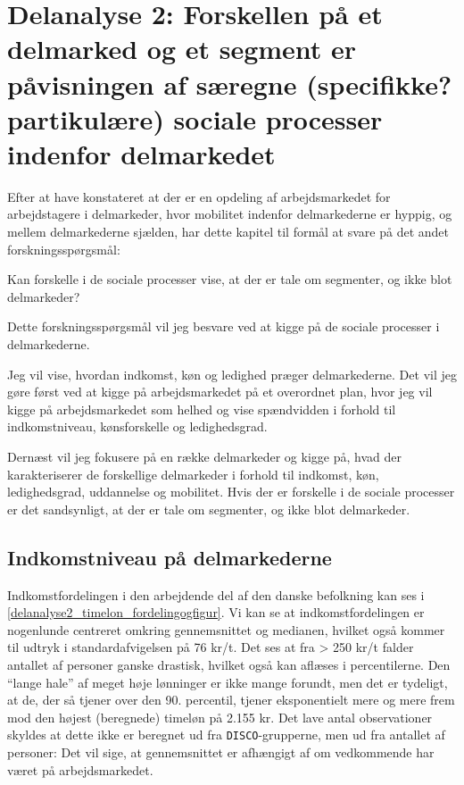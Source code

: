 

\chapter{Delanalyse 2: Forskellen på et delmarked og et segment er påvisningen af særegne (specifikke? partikulære) sociale processer indenfor delmarkedet \label{kapitel_delanalyse2_socialeprocesser}}

Efter at have konstateret at der er en opdeling af arbejdsmarkedet for arbejdstagere i delmarkeder, hvor mobilitet indenfor delmarkederne er hyppig, og mellem delmarkederne sjælden, har dette kapitel til formål at svare på det andet forskningsspørgsmål:

\begin{tcolorbox}[title=Forskningspørgsmål,
subtitle style={boxrule=0.4pt} ]
   Kan forskelle i de sociale processer vise, at der er tale om segmenter, og ikke blot delmarkeder?
\end{tcolorbox}

Dette forskningsspørgsmål vil jeg besvare ved at kigge på de sociale processer i delmarkederne.

Jeg vil vise, hvordan indkomst, køn og ledighed præger delmarkederne. Det vil jeg gøre først ved at kigge på arbejdsmarkedet på et overordnet plan, hvor jeg vil kigge på arbejdsmarkedet som helhed og vise spændvidden i forhold til indkomstniveau, kønsforskelle og ledighedsgrad.

Dernæst vil jeg fokusere på en række delmarkeder og kigge på, hvad der karakteriserer de forskellige delmarkeder i forhold til indkomst, køn, ledighedsgrad, uddannelse og mobilitet. Hvis der er forskelle i de sociale processer er det sandsynligt, at der er tale om segmenter, og ikke blot delmarkeder.


\section{Indkomstniveau på delmarkederne \label{sec_delanalyse2_loen}}

Indkomstfordelingen i den arbejdende del af den danske befolkning kan ses i \ref{delanalyse2_timelon_fordelingogfigur}. Vi kan se at indkomstfordelingen er nogenlunde centreret omkring gennemsnittet og medianen, hvilket også kommer til udtryk i standardafvigelsen på 76 kr/t. Det ses at fra > 250 kr/t falder antallet af personer ganske drastisk, hvilket også kan aflæses i percentilerne. Den “lange hale” af meget høje lønninger er ikke mange forundt, men det er tydeligt, at de, der så tjener over den 90. percentil, tjener eksponentielt mere og mere frem mod den højest (beregnede) timeløn på 2.155 kr. Det lave antal observationer skyldes at dette ikke er beregnet ud fra \texttt{DISCO}-grupperne, men ud fra antallet af personer: Det vil sige, at gennemsnittet er afhængigt af om vedkommende har været på arbejdsmarkedet.

